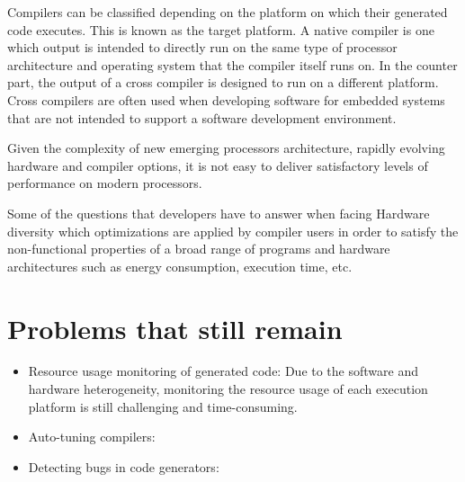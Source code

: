 Compilers can be classified depending on the platform on which their generated code executes. This is known as the target platform.
A native compiler is one which output is intended to directly run on the same type of processor architecture and operating system that the compiler itself runs on. In the counter part, the output of a cross compiler is designed to run on a different platform. Cross compilers are often used when developing software for embedded systems that are not intended to support a software development environment.

Given the complexity of new emerging processors architecture, rapidly evolving hardware and compiler options, it is not easy to deliver satisfactory levels of performance on modern processors.


Some of the questions that developers have to answer when facing Hardware diversity which optimizations are applied by compiler users in order to satisfy the non-functional properties of a broad range of programs and hardware architectures such as energy consumption, execution time, etc. 






\section{Problems that still remain}
\begin{itemize}
	\item Resource usage monitoring of generated code: Due to the software and hardware heterogeneity, monitoring the resource usage of each execution platform is still challenging and time-consuming. 
	\item Auto-tuning compilers:
	\item Detecting bugs in code generators: 
\end{itemize}
